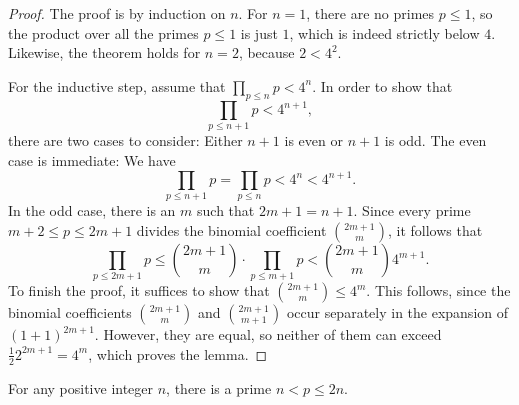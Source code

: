 \begin{proof}
  The proof is by induction on $n$. For $n=1$, there are no primes $p\leq 1$, so the product over all the primes $p\leq 1$ is just $1$, which is indeed strictly below $4$. Likewise, the theorem holds for $n=2$, because $2<4^2$.

  For the inductive step, assume that $\prod_{p\leq n}p<4^n$. In order to show that
  \begin{equation*}
    \prod_{p\leq n+1}p < 4^{n+1},
  \end{equation*}
  there are two cases to consider: Either $n+1$ is even or $n+1$ is odd. The even case is immediate: We have
  \begin{equation*}
    \prod_{p\leq n+1}p = \prod_{p\leq n}p < 4^n < 4^{n+1}.
  \end{equation*}
  In the odd case, there is an $m$ such that $2m+1=n+1$. Since every prime $m+2\leq p \leq 2m+1$ divides the binomial coefficient $\binom{2m+1}{m}$, it follows that
  \begin{equation*}
    \prod_{p\leq 2m+1}p\leq \binom{2m+1}{m}\cdot \prod_{p\leq m+1}p < \binom{2m + 1}{m} 4^{m+1}.
  \end{equation*}
  To finish the proof, it suffices to show that $\binom{2m+1}{m}\leq 4^m$. This follows, since the binomial coefficients $\binom{2m+1}{m}$ and $\binom{2m+1}{m+1}$ occur separately in the expansion of $(1+1)^{2m+1}$. However, they are equal, so neither of them can exceed $\frac{1}{2} 2^{2m+1}=4^m$, which proves the lemma.
\end{proof}

\begin{theorem}
  For any positive integer $n$, there is a prime $n<p\leq 2n$.
\end{theorem}

